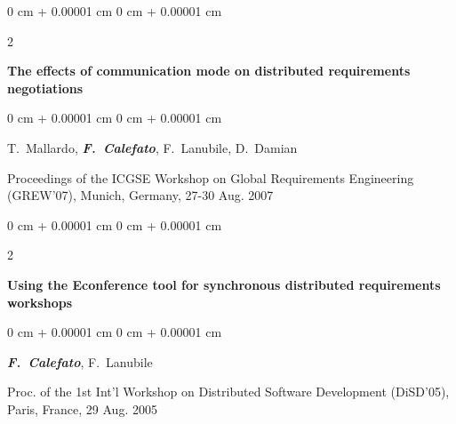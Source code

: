 \documentclass[10pt, a4paper]{article}
\newenvironment{onecolentry}{
    \begin{adjustwidth}{
        0 cm + 0.00001 cm
    }{
        0 cm + 0.00001 cm
    }
}{
    \end{adjustwidth}
} %
\newenvironment{twocolentry}[2][]{
    \onecolentry
    \def\secondColumn{#2}
    \setcolumnwidth{\fill, 4.5 cm}
    \begin{paracol}{2}
}{
    \switchcolumn \raggedleft \secondColumn
    \end{paracol}
    \endonecolentry
} %
\begin{document}
        \begin{samepage}
            \begin{twocolentry}{
                2007
            }
                \textbf{The effects of communication mode on distributed requirements negotiations}
            \end{twocolentry}

            \vspace{0.10 cm}
            
            \begin{onecolentry}
                \mbox{T. Mallardo}, \mbox{\textbf{\textit{F. Calefato}}}, \mbox{F. Lanubile}, \mbox{D. Damian}

                \vspace{0.10 cm}
                
        Proceedings of the ICGSE Workshop on Global Requirements Engineering (GREW'07), Munich, Germany, 27-30 Aug. 2007\end{onecolentry}
        \end{samepage}

        \vspace{0.2 cm}

        \begin{samepage}
            \begin{twocolentry}{
                2005
            }
                \textbf{Using the Econference tool for synchronous distributed requirements workshops}
            \end{twocolentry}

            \vspace{0.10 cm}
            
            \begin{onecolentry}
                \mbox{\textbf{\textit{F. Calefato}}}, \mbox{F. Lanubile}

                \vspace{0.10 cm}
                
        Proc. of the 1st Int’l Workshop on Distributed Software Development (DiSD'05), Paris, France, 29 Aug. 2005\end{onecolentry}
        \end{samepage}

        \vspace{0.2 cm}
\end{document}

